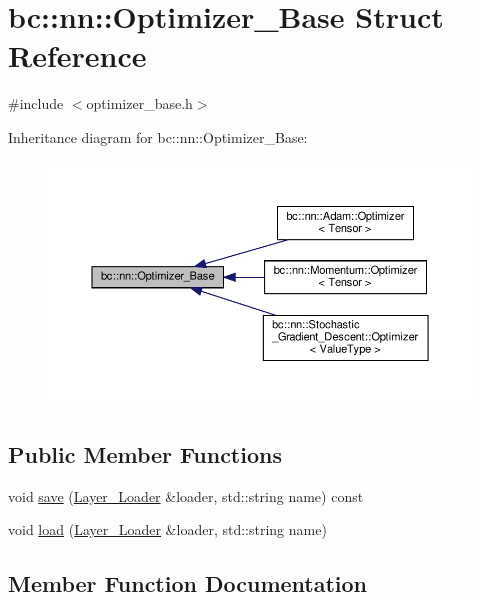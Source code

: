 \hypertarget{structbc_1_1nn_1_1Optimizer__Base}{}\section{bc\+:\+:nn\+:\+:Optimizer\+\_\+\+Base Struct Reference}
\label{structbc_1_1nn_1_1Optimizer__Base}


{\ttfamily \#include $<$optimizer\+\_\+base.\+h$>$}



Inheritance diagram for bc\+:\+:nn\+:\+:Optimizer\+\_\+\+Base\+:\nopagebreak
\begin{figure}[H]
\begin{center}
\leavevmode
\includegraphics[width=350pt]{structbc_1_1nn_1_1Optimizer__Base__inherit__graph}
\end{center}
\end{figure}
\subsection*{Public Member Functions}
\begin{DoxyCompactItemize}
\item 
void \hyperlink{structbc_1_1nn_1_1Optimizer__Base_a23ebaa008029f146e95c3a0bcbdd91a6}{save} (\hyperlink{structbc_1_1nn_1_1Layer__Loader}{Layer\+\_\+\+Loader} \&loader, std\+::string name) const
\item 
void \hyperlink{structbc_1_1nn_1_1Optimizer__Base_adb0dee8f363e650ff9ecc899b0f30199}{load} (\hyperlink{structbc_1_1nn_1_1Layer__Loader}{Layer\+\_\+\+Loader} \&loader, std\+::string name)
\end{DoxyCompactItemize}


\subsection{Member Function Documentation}
\mbox{\label{structbc_1_1nn_1_1Optimizer__Base_adb0dee8f363e650ff9ecc899b0f30199}} 
